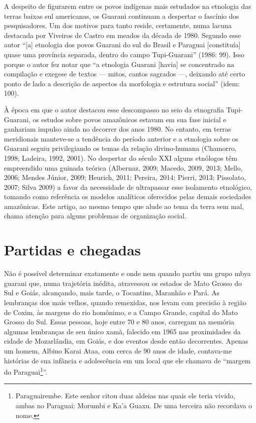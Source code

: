 A despeito de figurarem entre os povos indígenas mais estudados na
etnologia das terras baixas sul americanas, os Guarani continuam a
despertar o fascínio dos pesquisadores. Um dos motivos para tanto
reside, certamente, numa lacuna destacada por Viveiros de Castro em
meados da década de 1980. Segundo esse autor ``[a] etnologia dos povos
Guarani do sul do Brasil e Paraguai [constituía] quase uma província
separada, dentro do campo Tupi-Guarani'' (1986: 99). Isso porque o autor
fez notar que ``a etnologia Guarani [havia] se concentrado na compilação
e exegese de textos — mitos, cantos sagrados —, deixando até certo
ponto de lado a descrição de aspectos da morfologia e estrutura social''
(idem: 100).

À época em que o autor destacou esse descompasso no seio da etnografia
Tupi-Guarani, os estudos sobre povos amazônicos estavam em sua fase
inicial e ganhariam impulso ainda no decorrer dos anos 1980. No
entanto, em terras meridionais manteve-se a tendência do período
anterior e a etnologia sobre os Guarani seguiu privilegiando os temas
da relação divino-humana (Chamorro, 1998; Ladeira, 1992, 2001). No
despertar do século XXI alguns etnólogos têm empreendido uma guinada
teórica (Albernaz, 2009; Macedo, 2009, 2013; Mello, 2006; Mendes
Júnior, 2009; Heurich, 2011; Pereira, 2014; Pierri, 2013; Pissolato,
2007; Silva 2009) a favor da necessidade de ultrapassar esse isolamento
etnológico, tomando como referência os modelos analíticos oferecidos
pelas demais sociedades amazônicas. Este artigo, ao mesmo tempo que
alude ao tema da terra sem mal, chama atenção para alguns problemas de
organização social. 

\section{Partidas e chegadas}

Não é possível determinar exatamente e onde nem quando partiu um grupo
mbya guarani que, numa trajetória inédita, atravessou os estados de
Mato Grosso do Sul e Goiás, alcançando, mais tarde, o Tocantins,
Maranhão e Pará. As lembranças dos mais velhos, quando remexidas, nos
levam com precisão à região de Coxim, às margens do rio homônimo, e a
Campo Grande, capital do Mato Grosso do Sul. Essas pessoas, hoje entre
70 e 80 anos, carregam na memória algumas lembranças de seu único xamã,
falecido em 1965 nas proximidades da cidade de Mozarlândia, em Goiás, e
dos eventos desde então decorrentes. Apenas um homem, Albino Karai
Ataa, com cerca de 90 anos de idade, contava-me histórias de sua
infância e adolescência em um local que ele chamava de ``margem do
Paraguai\footnote{Paraguairembe. Este senhor citou duas aldeias nas
quais ele teria vivido, ambas no Paraguai: Morumbi e Ka’a Guaxu. De uma
terceira não recordava o nome.}''. 

